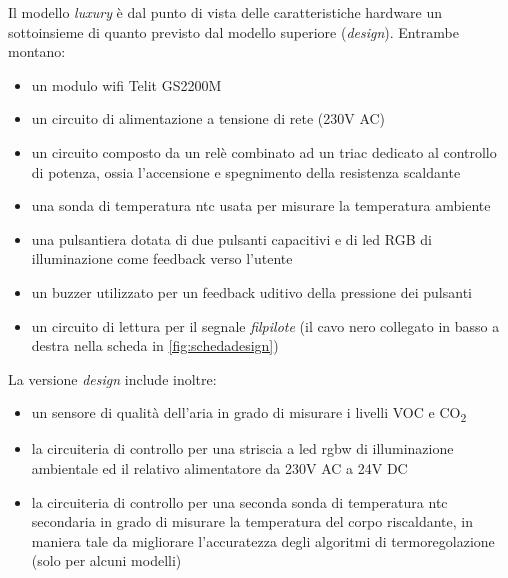 \documentclass[12pt,a4paper,twoside,titlepage]{book}
\begin{document}
Il modello \textit{luxury} è dal punto di vista delle caratteristiche hardware un sottoinsieme di quanto 
previsto dal modello superiore (\textit{design}). Entrambe montano:

\begin{itemize}
    \item un modulo \Gls{wifi} Telit GS2200M
    \item un circuito di alimentazione a tensione di rete (230V AC)
    \item un circuito composto da un relè combinato ad un triac dedicato al controllo di potenza, 
        ossia l'accensione e spegnimento della resistenza scaldante
    \item una sonda di temperatura \Gls{ntc} usata per misurare la temperatura ambiente
    \item una pulsantiera dotata di due pulsanti capacitivi e di \acrshort{led} RGB di illuminazione
        come feedback verso l'utente
    \item un buzzer utilizzato per un feedback uditivo della pressione dei pulsanti
    \item un circuito di lettura per il segnale \textit{\Gls{filpilote}} (il cavo nero collegato 
        in basso a destra nella scheda in \autoref{fig:schedadesign})
\end{itemize}

La versione \textit{design} include inoltre:
\begin{itemize}
    \item un sensore di qualità dell'aria in grado di misurare i livelli VOC e CO\textsubscript{2}
    \item la circuiteria di controllo per una striscia a \acrshort{led} \acrshort{rgbw} di illuminazione ambientale
        ed il relativo alimentatore da 230V AC a 24V DC
    \item la circuiteria di controllo per una seconda sonda di temperatura \acrshort{ntc} secondaria in grado di
        misurare la temperatura del corpo riscaldante, in maniera tale da migliorare
        l'accuratezza degli algoritmi di termoregolazione (solo per alcuni modelli)
\end{itemize}
\end{document}
